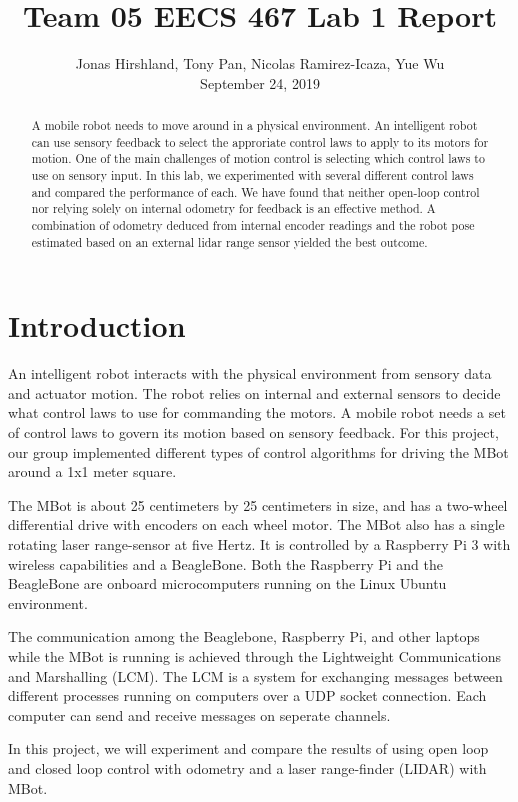 \documentclass[conference]{IEEEtran}
\title{Team 05 EECS 467 Lab 1 Report}
\author{Jonas Hirshland, Tony Pan, Nicolas Ramirez-Icaza, Yue Wu  \\\vspace*{20pt} \normalsize  September 24, 2019}
\begin{document}
\maketitle

\begin{abstract}
A mobile robot needs to move around in a physical environment. An intelligent robot can use sensory feedback to select the approriate control laws to apply to its motors for motion. One of the main challenges of motion control is selecting which control laws to use on sensory input. In this lab, we experimented with several different control laws and compared the performance of each. We have found that neither open-loop control nor relying solely on internal odometry for feedback is an effective method. A combination of odometry deduced from internal encoder readings and the robot pose estimated based on an external lidar range sensor yielded the best outcome. 
\end{abstract}


\section{Introduction}
An intelligent robot interacts with the physical environment from sensory data and actuator motion. The robot relies on internal and external sensors to decide what control laws to use for commanding the motors. A mobile robot needs a set of control laws to govern its motion based on sensory feedback. For this project, our group implemented different types of control algorithms for driving the MBot around a 1x1 meter square. 

The MBot is about 25 centimeters by 25 centimeters in size, and has a two-wheel differential drive with encoders on each wheel motor. The MBot also has a single rotating laser range-sensor at five Hertz. It is controlled by a Raspberry Pi 3 with wireless capabilities and a BeagleBone. Both the Raspberry Pi and the BeagleBone are onboard microcomputers running on the Linux Ubuntu environment.

The communication among the Beaglebone, Raspberry Pi, and other laptops while the MBot is running is achieved through the Lightweight Communications and Marshalling (LCM). The LCM is a system for exchanging messages between different processes running on computers over a UDP socket connection. Each computer can send and receive messages on seperate channels.

In this project, we will experiment and compare the results of using open loop and closed loop control with odometry and a laser range-finder (LIDAR) with MBot. 
\end{document}
